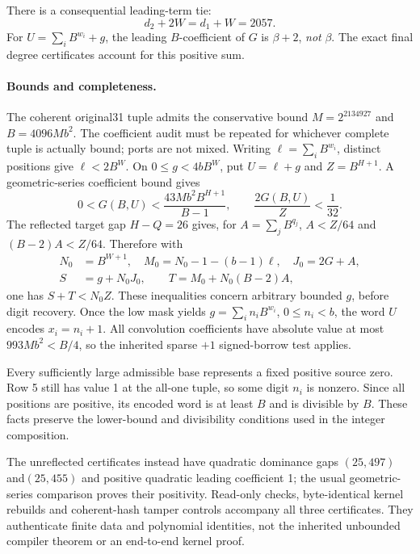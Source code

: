 There is a consequential leading-term tie:
\[
 d_2+2W=d_1+W=2057.
\]
For $U=\sum_iB^{w_i}+g$, the leading $B$-coefficient of $G$ is
$\beta+2$, \emph{not} $\beta$.  The exact final degree certificates account
for this positive sum.

\paragraph{Bounds and completeness.}
The coherent original31 tuple admits the conservative bound
$M=2^{2134927}$ and $B=4096Mb^2$.  The coefficient audit must be repeated
for whichever complete tuple is actually bound; ports are not mixed.
Writing $\ell=\sum_iB^{w_i}$, distinct positions give $\ell<2B^W$.
On $0\le g<4bB^W$, put $U=\ell+g$ and $Z=B^{H+1}$.
A geometric-series coefficient bound gives
\[
 0<G(B,U)<\frac{43Mb^2 B^{H+1}}{B-1},\qquad
 \frac{2G(B,U)}Z<\frac1{32}.
\]
The reflected target gap $H-Q=26$ gives, for $A=\sum_jB^{q_j}$,
$A<Z/64$ and $(B-2)A<Z/64$.  Therefore with
\[
 \begin{split}
 N_0&=B^{W+1},\quad M_0=N_0-1-(b-1)\ell,\quad J_0=2G+A,\\
 S&=g+N_0J_0,\qquad T=M_0+N_0(B-2)A,
 \end{split}
\]
one has $S+T<N_0Z$.  These inequalities concern arbitrary bounded $g$,
before digit recovery.  Once the low mask yields
$g=\sum_i n_iB^{w_i}$, $0\le n_i<b$, the word $U$ encodes $x_i=n_i+1$.
All convolution coefficients have absolute value at most
$993Mb^2<B/4$, so the inherited sparse $+1$ signed-borrow test applies.

Every sufficiently large admissible base represents a fixed positive source
zero.  Row 5 still has value 1 at the all-one tuple, so some digit $n_i$ is
nonzero.  Since all positions are positive, its encoded word is at least $B$
and is divisible by $B$.  These facts preserve the lower-bound and divisibility
conditions used in the integer composition.

The unreflected certificates instead have quadratic dominance gaps
$(25,497)$ and$(25,455)$ and positive quadratic leading coefficient 1; the
usual geometric-series comparison proves their positivity.  Read-only
checks, byte-identical kernel rebuilds and coherent-hash tamper controls
accompany all three certificates.  They authenticate finite data and
polynomial identities, not the inherited unbounded compiler theorem or
an end-to-end kernel proof.
